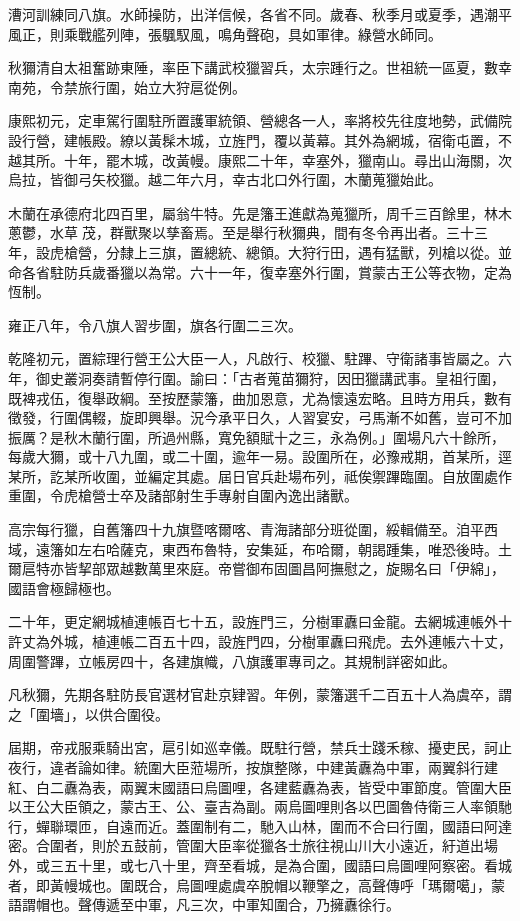\begin{pinyinscope}
漕河訓練同八旗。水師操防，出洋信候，各省不同。歲春、秋季月或夏季，遇潮平風正，則乘戰艦列陣，張颿馭風，鳴角聲砲，具如軍律。綠營水師同。

秋獮清自太祖奮跡東陲，率臣下講武校獵習兵，太宗踵行之。世祖統一區夏，數幸南苑，令禁旅行圍，始立大狩扈從例。

康熙初元，定車駕行圍駐所置護軍統領、營總各一人，率將校先往度地勢，武備院設行營，建帳殿。繚以黃髹木城，立旌門，覆以黃幕。其外為網城，宿衛屯置，不越其所。十年，罷木城，改黃幔。康熙二十年，幸塞外，獵南山。尋出山海關，次烏拉，皆御弓矢校獵。越二年六月，幸古北口外行圍，木蘭蒐獵始此。

木蘭在承德府北四百里，屬翁牛特。先是籓王進獻為蒐獵所，周千三百餘里，林木蔥鬱，水草茂，群獸聚以孳畜焉。至是舉行秋獮典，間有冬令再出者。三十三年，設虎槍營，分隸上三旗，置總統、總領。大狩行田，遇有猛獸，列槍以從。並命各省駐防兵歲番獵以為常。六十一年，復幸塞外行圍，賞蒙古王公等衣物，定為恆制。

雍正八年，令八旗人習步圍，旗各行圍二三次。

乾隆初元，置綜理行營王公大臣一人，凡啟行、校獵、駐蹕、守衛諸事皆屬之。六年，御史叢洞奏請暫停行圍。諭曰：「古者蒐苗獮狩，因田獵講武事。皇祖行圍，既裨戎伍，復舉政綱。至按歷蒙籓，曲加恩意，尤為懷遠宏略。且時方用兵，數有徵發，行圍偶輟，旋即興舉。況今承平日久，人習宴安，弓馬漸不如舊，豈可不加振厲？是秋木蘭行圍，所過州縣，寬免額賦十之三，永為例。」圍場凡六十餘所，每歲大獮，或十八九圍，或二十圍，逾年一易。設圍所在，必豫戒期，首某所，逕某所，訖某所收圍，並編定其處。屆日官兵赴場布列，祗俟禦蹕臨圍。自放圍處作重圍，令虎槍營士卒及諸部射生手專射自圍內逸出諸獸。

高宗每行獵，自舊籓四十九旗暨喀爾喀、青海諸部分班從圍，綏輯備至。洎平西域，遠籓如左右哈薩克，東西布魯特，安集延，布哈爾，朝謁踵集，唯恐後時。土爾扈特亦皆挈部眾越數萬里來庭。帝嘗御布固圖昌阿撫慰之，旋賜名曰「伊綿」，國語會極歸極也。

二十年，更定網城植連帳百七十五，設旌門三，分樹軍纛曰金龍。去網城連帳外十許丈為外城，植連帳二百五十四，設旌門四，分樹軍纛曰飛虎。去外連帳六十丈，周圍警蹕，立帳房四十，各建旗幟，八旗護軍專司之。其規制詳密如此。

凡秋獮，先期各駐防長官選材官赴京肄習。年例，蒙籓選千二百五十人為虞卒，謂之「圍墻」，以供合圍役。

屆期，帝戎服乘騎出宮，扈引如巡幸儀。既駐行營，禁兵士踐禾稼、擾吏民，訶止夜行，違者論如律。統圍大臣蒞場所，按旗整隊，中建黃纛為中軍，兩翼斜行建紅、白二纛為表，兩翼末國語曰烏圖哩，各建藍纛為表，皆受中軍節度。管圍大臣以王公大臣領之，蒙古王、公、臺吉為副。兩烏圖哩則各以巴圖魯侍衛三人率領馳行，蟬聯環匝，自遠而近。蓋圍制有二，馳入山林，圍而不合曰行圍，國語曰阿達密。合圍者，則於五鼓前，管圍大臣率從獵各士旅往視山川大小遠近，紆道出場外，或三五十里，或七八十里，齊至看城，是為合圍，國語曰烏圖哩阿察密。看城者，即黃幔城也。圍既合，烏圖哩處虞卒脫帽以鞭擎之，高聲傳呼「瑪爾噶」，蒙語謂帽也。聲傳遞至中軍，凡三次，中軍知圍合，乃擁纛徐行。


\end{pinyinscope}
